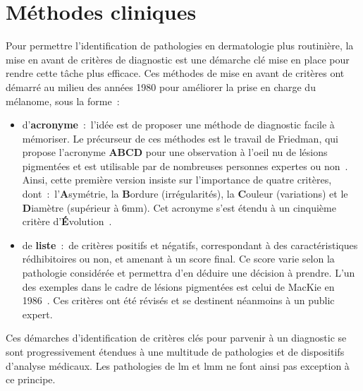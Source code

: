 \section{Méthodes cliniques}
\label{sec:clinical_methods}
Pour permettre l'identification de pathologies en dermatologie plus routinière, la mise en avant de critères de diagnostic est une démarche clé mise en place pour rendre cette tâche plus efficace. Ces méthodes de mise en avant de critères ont démarré au milieu des années 1980 pour améliorer la prise en charge du mélanome, sous la forme~:
\begin{itemize}
    \item d'\textbf{acronyme}~:~l'idée est de proposer une méthode de diagnostic facile à mémoriser. Le précurseur de ces méthodes est le travail de Friedman, qui propose l'acronyme \textbf{ABCD} pour une observation à l'oeil nu de lésions pigmentées et est utilisable par de nombreuses personnes expertes ou non~\cite{Friedman1985}. Ainsi, cette première version insiste sur l'importance de quatre critères, dont~:~l'\textbf{A}symétrie, la \textbf{B}ordure (irrégularités), la \textbf{C}ouleur (variations) et le \textbf{D}iamètre (supérieur à 6mm). Cet acronyme s'est étendu à un cinquième critère d'\textbf{É}volution~\cite{Abbasi2004}.
    \item de \textbf{liste}~:~de critères positifs et négatifs, correspondant à des caractéristiques rédhibitoires ou non, et amenant à un score final. Ce score varie selon la pathologie considérée et permettra d'en déduire une décision à prendre. L'un des exemples dans le cadre de lésions pigmentées est celui de MacKie en 1986~\cite{mackie1986}. Ces critères ont été révisés et se destinent néanmoins à un public expert.
\end{itemize}\par

Ces démarches d'identification de critères clés pour parvenir à un diagnostic se sont progressivement étendues à une multitude de pathologies et de dispositifs d'analyse médicaux. Les pathologies de \gls{lm} et \gls{lmm} ne font ainsi pas exception à ce principe.\par

